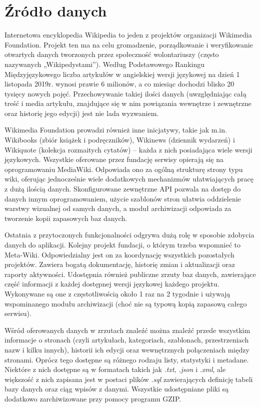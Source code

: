 \section{Źródło danych}
\label{sec:data-source}
Internetowa encyklopedia Wikipedia to jeden z projektów organizacji Wikimedia Foundation. Projekt ten ma na celu gromadzenie, porządkowanie i weryfikowanie otwartych danych tworzonych przez społeczność wolontariuszy (często nazywanych „Wikipedystami”). Według Podstawowego Rankingu Międzyjęzykowego \cite{Wiki:PodstawowyRanking} liczba artykułów w angielskiej wersji językowej na dzień 1 listopada 2019r. wynosi prawie 6 milionów, a co miesiąc dochodzi blisko 20 tysięcy nowych pojęć. Przechowywanie takiej ilości danych (uwzględniając całą treść i media artykułu, znajdujące się w nim powiązania wewnętrze i zewnętrzne oraz historię jego edycji) jest nie lada wyzwaniem.

Wikimedia Foundation prowadzi również inne inicjatywy, takie jak m.in. Wikibooks (zbiór książek i podręczników), Wikinews (dziennik wydarzeń) i Wikiquote (kolekcja rozmaitych cytatów) – każda z nich posiadająca wiele wersji językowych. Wszystkie oferowane przez fundację serwisy opierają się na oprogramowaniu MediaWiki. Odpowiada ono za ogólną strukturę strony typu wiki, oferując jednocześnie wiele dodatkowych mechanizmów ułatwiających pracę z dużą ilością danych. Skonfigurowane zewnętrzne API pozwala na dostęp do danych innym oprogramowaniem, użycie szablonów stron ułatwia oddzielenie warstwy wizualnej od samych danych, a moduł archiwizacji odpowiada za tworzenie kopii zapasowych baz danych.

Ostatnia z przytoczonych funkcjonalności odgrywa dużą rolę w sposobie zdobycia danych do aplikacji. Kolejny projekt fundacji, o którym trzeba wspomnieć to Meta-Wiki. Odpowiedzialny jest on za koordynację wszystkich pozostałych projektów. Zawiera bogatą dokumentację, historię zmian i aktualizacji oraz raporty aktywności. Udostępnia również publiczne zrzuty baz danych, zawierające część informacji z każdej dostępnej wersji językowej każdego projektu. Wykonywane są one z częstotliwością około 1 raz na 2 tygodnie i używają wspominanego modułu archiwizacji (choć nie są typową kopią zapasową całego serwisu).

Wśród oferowanych danych w zrzutach znaleźć można znaleźć przede wszystkim informacje o stronach (czyli artykułach, kategoriach, szablonach, przestrzeniach nazw i kilku innych), historii ich edycji oraz wewnętrznych połączeniach między stronami. Oprócz tego dostępne są różnego rodzaju listy, statystyki i metadane. Niektóre z nich dostępne są w formatach takich jak \textit{.txt}, \textit{.json} i \textit{.xml}, ale większość z nich zapisana jest w postaci plików \textit{.sql} zawierających definicję tabeli bazy danych oraz ciąg wpisów z danymi. Wszystkie udostępniane pliki są dodatkowo zarchiwizowane przy pomocy programu GZIP.